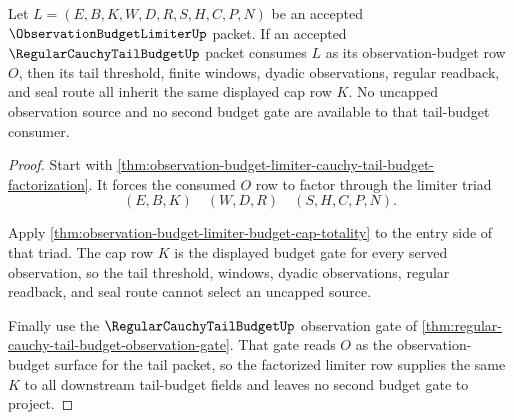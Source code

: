 \begin{theorem}
\label{thm:observation-budget-limiter-tail-budget-shared-cap}
Let $L=(E,B,K,W,D,R,S,H,C,P,N)$ be an accepted $\ObservationBudgetLimiterUp$
packet. If an accepted $\RegularCauchyTailBudgetUp$ packet consumes $L$ as its
observation-budget row $O$, then its tail threshold, finite windows, dyadic
observations, regular readback, and seal route all inherit the same displayed
cap row $K$. No uncapped observation source and no second budget gate are
available to that tail-budget consumer.
\end{theorem}
\begin{proof}
Start with
\autoref{thm:observation-budget-limiter-cauchy-tail-budget-factorization}. It
forces the consumed $O$ row to factor through the limiter triad
$$
(E,B,K) \quad (W,D,R) \quad (S,H,C,P,N).
$$

Apply \autoref{thm:observation-budget-limiter-budget-cap-totality} to the entry
side of that triad. The cap row $K$ is the displayed budget gate for every
served observation, so the tail threshold, windows, dyadic observations,
regular readback, and seal route cannot select an uncapped source.

Finally use the $\RegularCauchyTailBudgetUp$ observation gate of
\autoref{thm:regular-cauchy-tail-budget-observation-gate}. That gate reads $O$
as the observation-budget surface for the tail packet, so the factorized
limiter row supplies the same $K$ to all downstream tail-budget fields and
leaves no second budget gate to project.
\end{proof}

